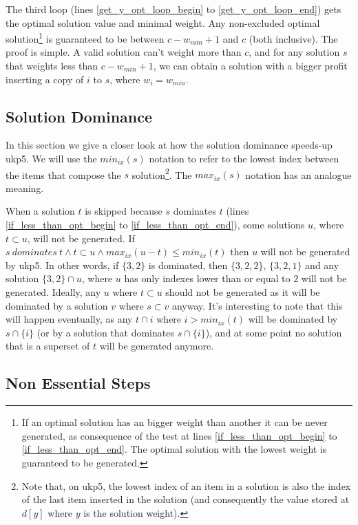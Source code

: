 \documentclass[runningheads,a4paper]{llncs}
\begin{document}
The third loop (lines \ref{get_y_opt_loop_begin} to \ref{get_y_opt_loop_end}) gets the optimal solution value and minimal weight. Any non-excluded optimal solution\footnote{If an optimal solution has an bigger weight than another it can be never generated, as consequence of the test at lines \ref{if_less_than_opt_begin} to \ref{if_less_than_opt_end}. The optimal solution with the lowest weight is guaranteed to be generated.} is guaranteed to be between \(c - w_{min} + 1\) and \(c\) (both inclusive). The proof is simple. A valid solution can't weight more than \(c\), and for any solution \(s\) that weights less than \(c - w_{min} + 1\), we can obtain a solution with a bigger profit inserting a copy of \(i\) to \(s\), where \(w_i = w_{min}\).

\subsection{Solution Dominance}

In this section we give a closer look at how the solution dominance speeds-up ukp5. We will use the \(min_{ix}(s)\) notation to refer to the lowest index between the items that compose the \(s\) solution\footnote{Note that, on ukp5, the lowest index of an item in a solution is also the index of the last item inserted in the solution (and consequently the value stored at \(d[y]\) where \(y\) is the solution weight).}. The \(max_{ix}(s)\) notation has an analogue meaning.

When a solution \(t\) is skipped because \(s\) dominates \(t\) (lines \ref{if_less_than_opt_begin} to \ref{if_less_than_opt_end}), some solutions \(u\), where \(t \subset u\), will not be generated. If \(s~dominates~t \land t \subset u \land max_{ix}(u - t) \leq min_{ix}(t)\) then \(u\) will not be generated by ukp5. In other words, if \(\{3, 2\}\) is dominated, then \(\{3, 2, 2\}\), \(\{3, 2, 1\}\) and any solution \(\{3, 2\} \cap u\), where \(u\) has only indexes lower than or equal to \(2\) will not be generated. Ideally, any \(u\) where \(t \subset u\) should not be generated as it will be dominated by a solution \(v\) where \(s \subset v\) anyway. It's interesting to note that this will happen eventually, as any \(t \cap {i}\) where \(i > min_{ix}(t)\) will be dominated by \(s \cap \{i\}\) (or by a solution that dominates \(s \cap \{i\}\)), and at some point no solution that is a superset of \(t\) will be generated anymore.

\subsection{Non Essential Steps}
\end{document}
